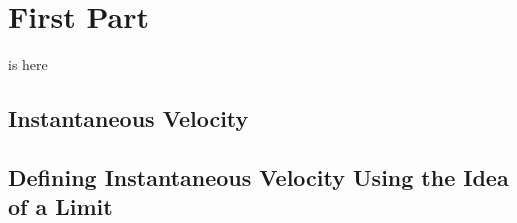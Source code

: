 \section{First Part}
is here
\subsection{Instantaneous Velocity}

\subsection{Defining Instantaneous Velocity Using the Idea of a Limit}
\vfill